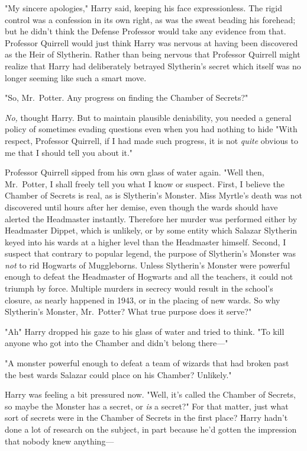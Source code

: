 "My sincere apologies," Harry said, keeping his face expressionless. The rigid
control was a confession in its own right, as was the sweat beading his
forehead; but he didn't think the Defense Professor would take any evidence
from that. Professor Quirrell would just think Harry was nervous at having been
discovered as the Heir of Slytherin. Rather than being nervous that Professor
Quirrell might realize that Harry had deliberately betrayed Slytherin's
secret{\el} which itself was no longer seeming like such a smart move.

"So, Mr.~Potter. Any progress on finding the Chamber of Secrets?"

\emph{No,} thought Harry. But to maintain plausible deniability, you needed a
general policy of sometimes evading questions even when you had nothing to
hide{\el} "With respect, Professor Quirrell, if I had made such progress, it
is not \emph{quite} obvious to me that I should tell you about it."

Professor Quirrell sipped from his own glass of water again. "Well then,
Mr.~Potter, I shall freely tell you what I know or suspect. First, I believe
the Chamber of Secrets is real, as is Slytherin's Monster. Miss Myrtle's death
was not discovered until hours after her demise, even though the wards should
have alerted the Headmaster instantly. Therefore her murder was performed
either by Headmaster Dippet, which is unlikely, or by some entity which Salazar
Slytherin keyed into his wards at a higher level than the Headmaster himself.
Second, I suspect that contrary to popular legend, the purpose of Slytherin's
Monster was \emph{not} to rid Hogwarts of Muggleborns. Unless Slytherin's
Monster were powerful enough to defeat the Headmaster of Hogwarts and all the
teachers, it could not triumph by force. Multiple murders in secrecy would
result in the school's closure, as nearly happened in 1943, or in the placing
of new wards. So why Slytherin's Monster, Mr.~Potter? What true purpose does it
serve?"

"Ah{\el}" Harry dropped his gaze to his glass of water and tried to think. "To
kill anyone who got into the Chamber and didn't belong there\mbox{---}"

"A monster powerful enough to defeat a team of wizards that had broken past the
best wards Salazar could place on his Chamber? Unlikely."

Harry was feeling a bit pressured now. "Well, it's called the Chamber of
Secrets, so maybe the Monster has a secret, or \emph{is} a secret?" For that
matter, just what sort of secrets were in the Chamber of Secrets in the first
place? Harry hadn't done a lot of research on the subject, in part because he'd
gotten the impression that nobody knew anything---


